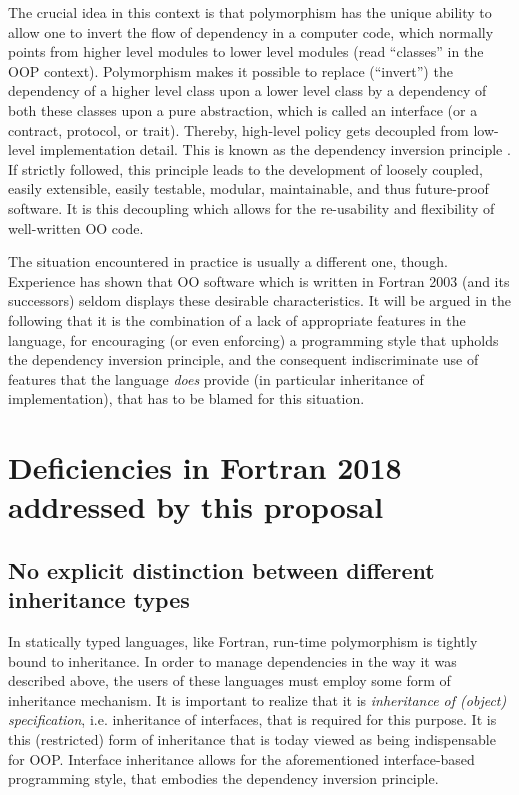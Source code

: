 \documentclass[11pt,oneside]{article}
\begin{document}
The crucial idea in this context is that polymorphism has the unique
ability to allow one to invert the flow of dependency in a computer
code, which normally points from higher level modules to lower level
modules (read ``classes'' in the OOP context). Polymorphism makes it
possible to replace (``invert'') the dependency of a higher level
class upon a lower level class by a dependency of both these classes
upon a pure abstraction, which is called an interface (or a contract,
protocol, or trait). Thereby, high-level policy gets decoupled from
low-level implementation detail. This is known as the dependency
inversion principle \cite{Martin_03}. If strictly followed, this
principle leads to the development of loosely coupled, easily
extensible, easily testable, modular, maintainable, and thus
future-proof software. It is this decoupling which allows for the
re-usability and flexibility of well-written OO code.

The situation encountered in practice is usually a different one,
though. Experience has shown that OO software which is written in
Fortran 2003 (and its successors) seldom displays these desirable
characteristics. It will be argued in the following that it is the
combination of a lack of appropriate features in the language, for
encouraging (or even enforcing) a programming style that upholds the
dependency inversion principle, and the consequent indiscriminate use
of features that the language \emph{does} provide (in particular
inheritance of implementation), that has to be blamed for this
situation.

\section{Deficiencies in Fortran 2018 addressed by this proposal}
\label{sect:F08_deficits}

\subsection{No explicit distinction between different inheritance types}

In statically typed languages, like Fortran, run-time polymorphism is
tightly bound to inheritance. In order to manage dependencies in the
way it was described above, the users of these languages must employ
some form of inheritance mechanism. It is important to realize that it
is \emph{inheritance of (object) specification}, i.e. inheritance of
interfaces, that is required for this purpose. It is this (restricted)
form of inheritance that is today viewed as being indispensable for
OOP. Interface inheritance allows for the aforementioned
interface-based programming style, that embodies the dependency
inversion principle.
\end{document}
